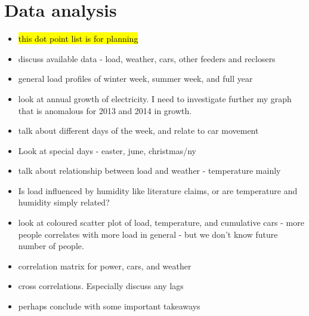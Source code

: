 \section{Data analysis}
\begin{itemize}
	\item \hl{this dot point list is for planning}
	\item discuss available data - load, weather, cars, other feeders and reclosers
	\item general load profiles of winter week, summer week, and full year
	\item look at annual growth of electricity. I need to investigate further my graph that is anomalous for 2013 and 2014 in growth.
	\item talk about different days of the week, and relate to car movement
	\item Look at special days - easter, june, christmas/ny
	\item talk about relationship between load and weather - temperature mainly
	\item Is load influenced by humidity like literature claims, or are temperature and humidity simply related?
	\item look at coloured scatter plot of load, temperature, and cumulative cars - more people correlates with more load in general - but we don't know future number of people.
	\item correlation matrix for power, cars, and weather
	\item cross correlations. Especially discuss any lags
	\item perhaps conclude with some important takeaways
	
\end{itemize}

